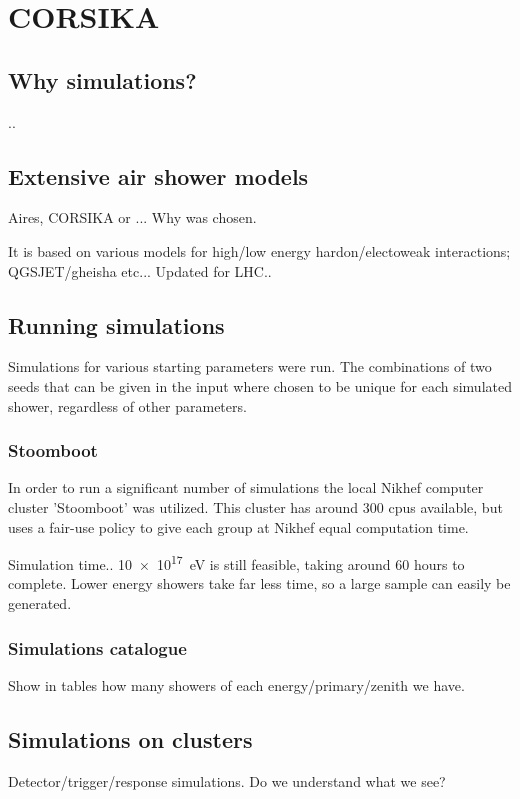 \chapter{CORSIKA}
\label{ch:corsika}

\section{Why simulations?}

..


\section{Extensive air shower models}


Aires, CORSIKA or ...
Why was \corsika chosen.

It is based on various models for high/low energy hardon/electoweak
interactions; QGSJET/gheisha etc... Updated for LHC..


\section{Running simulations}

Simulations for various starting parameters were run. The combinations
of two seeds that can be given in the input where chosen to be unique
for each simulated shower, regardless of other parameters.


\subsection{Stoomboot}

In order to run a significant number of simulations the local Nikhef
computer cluster 'Stoomboot' was utilized. This cluster has around 300
cpus available, but uses a fair-use policy to give each group at Nikhef
equal computation time.

Simulation time.. \SI{10e17}{\electronvolt} is still feasible, taking
around 60 hours to complete. Lower energy showers take far less time, so
a large sample can easily be generated.


\subsection{Simulations catalogue}

Show in tables how many showers of each energy/primary/zenith we have.


\section{Simulations on clusters}

Detector/trigger/response simulations. Do we understand what we see?
